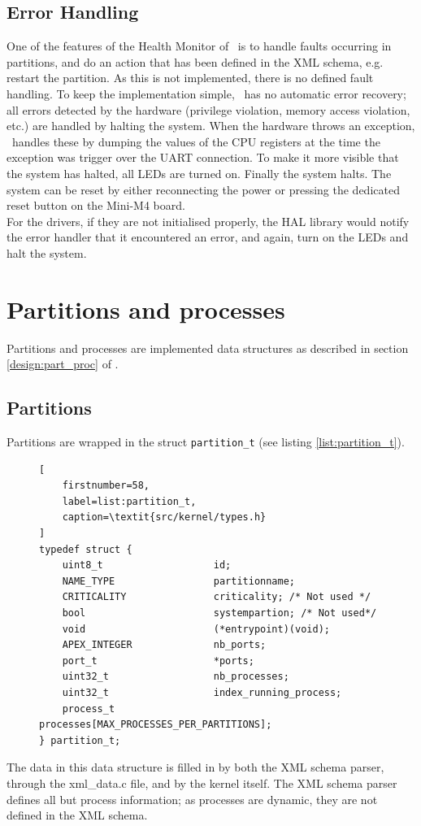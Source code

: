 \subsection{Error Handling}
One of the features of the Health Monitor of \arinc\ is to handle faults
occurring in partitions, and do an action that has been defined in the XML
schema, e.g. restart the partition. As this is not implemented, there is no
defined fault handling. To keep the implementation simple, \OSname\ has no
automatic error recovery; all errors detected by the hardware (privilege
violation, memory access violation, etc.) are handled by halting the system.
When the hardware throws an exception, \OSname\ handles these by dumping the
values of the CPU registers at the time the exception was trigger over the UART
connection. To make it more visible that the system has halted, all LEDs are
turned on. Finally the system halts. The system can be reset by either reconnecting
the power or pressing the dedicated reset button on the Mini-M4 board.\\

For the drivers, if they are not initialised properly, the HAL library
would notify the error handler that it encountered an error, and again, turn
on the LEDs and halt the system.


\section{Partitions and processes}
Partitions and processes are implemented data structures as described in section
\ref{design:part_proc} of .


\subsection{Partitions}
Partitions are wrapped in the struct \texttt{partition\_t} (see listing
\ref{list:partition_t}).
\begin{figure}
	\lstset{
		breaklines=true
	}
\begin{lstlisting}[
	firstnumber=58,
	label=list:partition_t,
	caption=\textit{src/kernel/types.h}
]
typedef struct {
    uint8_t                   id;
    NAME_TYPE                 partitionname;
    CRITICALITY	              criticality; /* Not used */
    bool                      systempartion; /* Not used*/
    void                      (*entrypoint)(void);
    APEX_INTEGER              nb_ports;
    port_t                    *ports;
    uint32_t                  nb_processes;
    uint32_t                  index_running_process;
    process_t                 processes[MAX_PROCESSES_PER_PARTITIONS];
} partition_t;
\end{lstlisting}
\end{figure}
The data in this data structure is filled in by both the
XML schema parser, through the xml\_data.c file, and by the kernel itself.
The XML schema parser defines all but process information; as processes are
dynamic, they are not defined in the XML schema.

